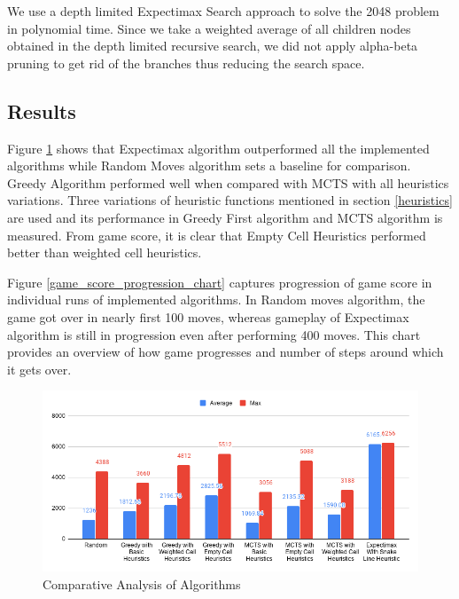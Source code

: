 \documentclass{svproc}
\begin{document}
    We use a depth limited Expectimax Search approach to solve the 2048 problem in polynomial time. Since we take a weighted average of all children nodes obtained in the depth limited recursive search, we did not apply alpha-beta pruning \cite{7162574} to get rid of the branches thus reducing the search space.


    \subsection{Results}

    Figure \ref{comparative_analysis_of_algorithms} shows that Expectimax algorithm outperformed all the implemented algorithms while Random Moves algorithm sets a baseline for comparison. Greedy Algorithm performed well when compared with MCTS with all heuristics variations. Three variations of heuristic functions mentioned in section \ref{heuristics} are used and its performance in Greedy First algorithm and MCTS algorithm is measured. From game score, it is clear that Empty Cell Heuristics performed better than weighted cell heuristics.

    Figure \ref{game_score_progression_chart} captures progression of game score in individual runs of implemented algorithms. In Random moves algorithm, the game got over in nearly first 100 moves, whereas gameplay of Expectimax algorithm is still in progression even after performing 400 moves. This chart provides an overview of how game progresses and number of steps around which it gets over.

    \begin{figure}[h!]

        \centering
        \includegraphics[width=1.0\textwidth]{Comparative Analysis.png}
        \caption{Comparative Analysis of Algorithms}
        \label{comparative_analysis_of_algorithms}
    \end{figure}
\end{document}
